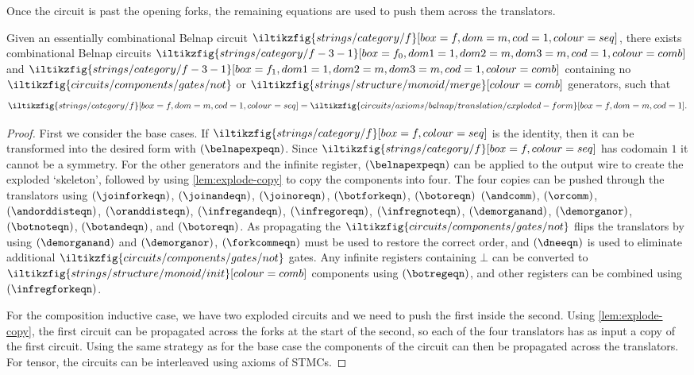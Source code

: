 Once the circuit is past the opening forks, the remaining equations are used to
push them across the translators.

\begin{proposition}\label{prop:exploded-belnap}
    Given an essentially combinational Belnap circuit \(
    \iltikzfig{strings/category/f}[box=f,dom=m,cod=1,colour=seq]
    \), there exists combinational Belnap circuits \(
    \iltikzfig{strings/category/f-3-1}[box=f_0,dom1=1,dom2=m,dom3=m,cod=1,colour=comb]
    \) and \(
    \iltikzfig{strings/category/f-3-1}[box=f_1,dom1=1,dom2=m,dom3=m,cod=1,colour=comb]
    \) containing no \(
    \iltikzfig{circuits/components/gates/not}
    \) or \(
    \iltikzfig{strings/structure/monoid/merge}[colour=comb]
    \) generators, such that \[
        \iltikzfig{strings/category/f}[box=f,dom=m,cod=1,colour=seq]
        =
        \iltikzfig{circuits/axioms/belnap/translation/exploded-form}[box=f,dom=m,cod=1].
    \]
\end{proposition}
\begin{proof}
    First we consider the base cases.
    If \(
    \iltikzfig{strings/category/f}[box=f,colour=seq]
    \) is the identity, then it can be transformed into the desired form
    with
    \((\belnapexpeqn)\).
    Since \(\iltikzfig{strings/category/f}[box=f,colour=seq]\) has codomain
    \(1\) it cannot be a symmetry.
    For the other generators and the infinite register,
    \((\belnapexpeqn)\) can be applied to the output wire to create the
    exploded `skeleton', followed by using \cref{lem:explode-copy} to copy the
    components into four.
    The four copies can be pushed through the translators
    using \((\joinforkeqn)\), \((\joinandeqn)\), \((\joinoreqn)\),
    \((\botforkeqn)\), \((\botoreqn)\) \((\andcomm)\), \((\orcomm)\),
    \((\andorddisteqn)\), \((\oranddisteqn)\), \((\infregandeqn)\),
    \((\infregoreqn)\), \((\infregnoteqn)\), \((\demorganand)\),
    \((\demorganor)\), \((\botnoteqn)\), \((\botandeqn)\), and \((\botoreqn)\).
    As propagating the \(
    \iltikzfig{circuits/components/gates/not}
    \) flips the translators by using \((\demorganand)\) and \((\demorganor)\),
    \((\forkcommeqn)\) must be used to restore the correct order, and
    \((\dneeqn)\) is used to eliminate additional
    \(\iltikzfig{circuits/components/gates/not}\) gates.
    Any infinite registers containing \(\bot\) can be converted to
    \(\iltikzfig{strings/structure/monoid/init}[colour=comb]\) components using
    \((\botregeqn)\), and other registers can be combined using
    \((\infregforkeqn)\).

    For the composition inductive case, we have two exploded circuits and we
    need to push the first inside the second.
    Using \cref{lem:explode-copy}, the first circuit can be propagated across
    the forks at the start of the second, so each of the four translators has as
    input a copy of the first circuit.
    Using the same strategy as for the base case the components of the circuit
    can then be propagated across the translators.
    For tensor, the circuits can be interleaved using axioms of STMCs.
\end{proof}
%


